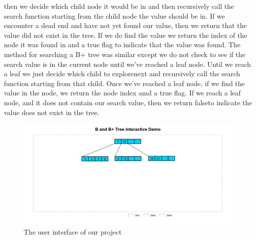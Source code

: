 then we decide which child node it would be in and then recursively call the search function starting from the child node the value 
should be in.  If we encounter a dead end and have not yet found our value, then we return that the value did not exist in the tree.
If we do find the value we return the index of the node it was found in and a true flag to indicate that the value was found.  The 
method for searching a B+ tree was similar except we do not check to see if the search value is in the current node until we've 
reached a leaf node.  Until we reach a leaf we just decide which child to explorenext and recursively call the search function 
starting from that child.  Once we've reached a leaf node, if we find the value in the node, we return the node index amd a true flag.
  If we reach a leaf node, and it does not contain our search value, then we return falseto indicate the value does not exist in the tree.

\begin{figure}[htp]
\centering
\includegraphics[scale=0.25]{images/Interface.png}
\caption{The user interface of our project}
\label{UI}
\end{figure}
